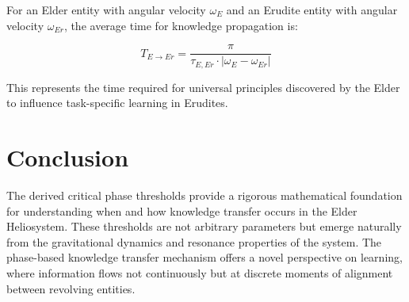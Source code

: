 \begin{corollary}
For an Elder entity with angular velocity $\omega_E$ and an Erudite entity with angular velocity $\omega_{Er}$, the average time for knowledge propagation is:

\begin{equation}
T_{E \to Er} = \frac{\pi}{\tau_{E,Er} \cdot |\omega_E - \omega_{Er}|}
\end{equation}

This represents the time required for universal principles discovered by the Elder to influence task-specific learning in Erudites.
\end{corollary}

\section{Conclusion}

The derived critical phase thresholds provide a rigorous mathematical foundation for understanding when and how knowledge transfer occurs in the Elder Heliosystem. These thresholds are not arbitrary parameters but emerge naturally from the gravitational dynamics and resonance properties of the system. The phase-based knowledge transfer mechanism offers a novel perspective on learning, where information flows not continuously but at discrete moments of alignment between revolving entities.